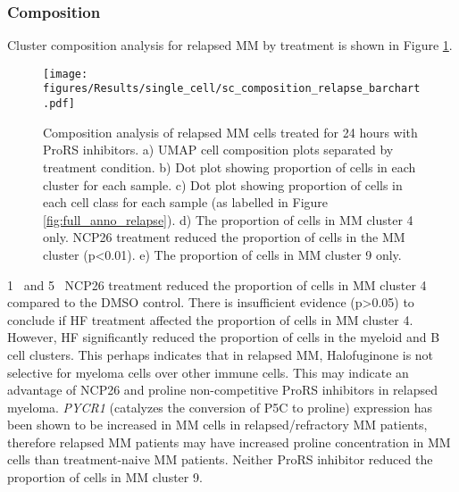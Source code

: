 \subsubsection{Composition}
Cluster composition analysis for relapsed MM by treatment is shown in Figure \ref{fig:composition_relapse}.
\begin{figure}[htb]
\centering
\texttt{[image: figures/Results/single\_cell/sc\_composition\_relapse\_barchart.pdf]}
\caption[scRNA-seq composition analysis- relapsed MM]{Composition analysis of relapsed MM cells treated for 24 hours with ProRS inhibitors.
    a) UMAP cell composition plots separated by treatment condition.
    b) Dot plot showing proportion of cells in each cluster for each sample.
    c) Dot plot showing proportion of cells in each cell class for each sample (as labelled in Figure \ref{fig:full_anno_relapse}).
    d) The proportion of cells in MM cluster 4 only.
NCP26 treatment reduced the proportion of cells in the MM cluster (p<0.01).
    e) The proportion of cells in MM cluster 9 only.}
\label{fig:composition_relapse}
\end{figure}
1\si{\micro\Molar} and 5\si{\micro\Molar} NCP26 treatment reduced the proportion of cells in MM cluster 4 compared to the DMSO control.
There is insufficient evidence (p>0.05) to conclude if HF treatment affected the proportion of cells in MM cluster 4.
However, HF significantly reduced the proportion of cells in the myeloid and B cell clusters.
This perhaps indicates that in relapsed MM, Halofuginone is not selective for myeloma cells over other immune cells.
This may indicate an advantage of NCP26 and proline non-competitive ProRS inhibitors in relapsed myeloma.
\textit{PYCR1} (catalyzes the conversion of P5C to proline) expression has been shown to be increased in MM cells in relapsed/refractory MM patients\cite{oudaert2022pyrroline}, therefore relapsed MM patients may have increased proline concentration in MM cells than treatment-naive MM patients.
Neither ProRS inhibitor reduced the proportion of cells in MM cluster 9.

